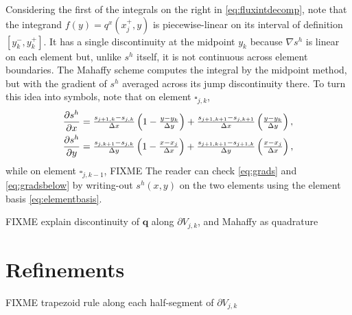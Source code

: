 \documentclass[11pt]{amsart}
\newcommand\bq{\mathbf{q}}
\newcommand{\grad}{\nabla}
\begin{document}
Considering the first of the integrals on the right in \eqref{eq:fluxintdecomp}, note that the integrand $f(y) = q^x(x_j^+,y)$ is piecewise-linear on its interval of definition $[y_k^-,y_k^+]$.  It has a single discontinuity at the midpoint $y_k$ because $\grad s^h$ is linear on each element but, unlike $s^h$ itself, it is not continuous across element boundaries.  The Mahaffy scheme computes the integral by the midpoint method, but with the gradient of $s^h$ averaged across its jump discontinuity there.  To turn this idea into symbols, note that on element $\square_{j,k}$,
\begin{align}
\frac{\partial s^h}{\partial x} &= \tfrac{s_{j+1,k}-s_{j,k}}{\Delta x} \left(1-\tfrac{y-y_k}{\Delta y}\right) + \tfrac{s_{j+1,k+1}-s_{j,k+1}}{\Delta x} \left(\tfrac{y-y_k}{\Delta y}\right), \label{eq:grads} \\
\frac{\partial s^h}{\partial y} &= \tfrac{s_{j,k+1}-s_{j,k}}{\Delta y} \left(1-\tfrac{x-x_j}{\Delta x}\right) + \tfrac{s_{j+1,k+1}-s_{j+1,k}}{\Delta y} \left(\tfrac{x-x_j}{\Delta x}\right), \notag
\end{align}
while on element $\square_{j,k-1}$,
FIXME
The reader can check \eqref{eq:grads} and \eqref{eq:gradsbelow} by writing-out $s^h(x,y)$ on the two elements using the element basis \eqref{eq:elementbasis}.

FIXME explain discontinuity of $\bq$ along $\partial V_{j,k}$, and Mahaffy as quadrature

\section{Refinements}

FIXME trapezoid rule along each half-segment of  $\partial V_{j,k}$






\begin{comment}
Here is what the MPAS Land-Ice User's Manual version 3.0 says:

\begin{quote}
\small
Velocities and fluxes are calculated on the midpoint of Voronoi cell edges.  The normal component of surface slope is calculated on cell edges using surface elevation at adjacent cell centers.  The tangential component of surface slope is calculated on cell edges using surface elevation at adjacent vertices. The surface elevation at vertices is calculated from the values at adjacent cell centers using barycentric interpolation. Ice thickness on edges is calculated as the average of the adjacent cell center values (2nd-order approximation).
\end{quote}

Looking at this, and the code, I don't think they think of it as Petrov-Galerkin
\end{comment}
\end{document}
